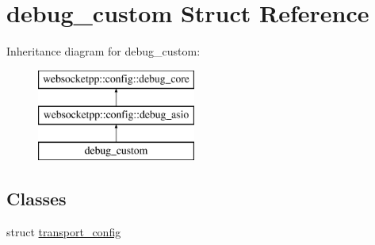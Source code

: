\hypertarget{structdebug__custom}{}\section{debug\+\_\+custom Struct Reference}
\label{structdebug__custom}
Inheritance diagram for debug\+\_\+custom\+:\begin{figure}[H]
\begin{center}
\leavevmode
\includegraphics[height=3.000000cm]{structdebug__custom}
\end{center}
\end{figure}
\subsection*{Classes}
\begin{DoxyCompactItemize}
\item 
struct \hyperlink{structdebug__custom_1_1transport__config}{transport\+\_\+config}
\end{DoxyCompactItemize}
